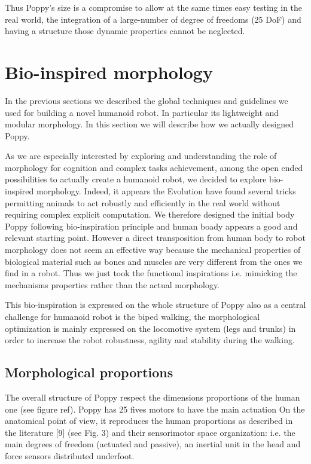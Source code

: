 Thus Poppy's size is a compromise to allow at the same times easy testing in the real world, the integration of a large-number of degree of freedoms (25 DoF) and having a structure those dynamic properties cannot be neglected.



\section{Bio-inspired morphology} %

In the previous sections we described the global techniques and guidelines we used for building a novel humanoid robot. In particular its lightweight and modular morphology. In this section we will describe how we actually designed Poppy.

As we are especially interested by exploring and understanding the role of morphology for cognition and complex tasks achievement, among the open ended possibilities to actually create a humanoid robot, we decided to explore bio-inspired morphology. Indeed, it appears the Evolution have found several tricks permitting animals to act robustly and efficiently in the real world without requiring complex explicit computation.
We therefore designed the initial body Poppy following bio-inspiration principle and human boady appears a good  and relevant starting point. However a direct transposition from human body to robot morphology does not seem an effective way because the mechanical properties of biological material such as bones and muscles are very different from the ones we find in a robot. Thus we just took the functional inspirations i.e. mimicking the mechanisms properties rather than the actual morphology.

This bio-inspiration is expressed on the whole structure of Poppy also as a central challenge for humanoid robot is the biped walking, the morphological optimization is mainly expressed on the locomotive system (legs and trunks) in order to increase the robot robustness, agility and stability during the walking.


\subsection{Morphological proportions} %

The overall structure of Poppy respect the dimensions proportions of the human one (see figure ref). Poppy has 25 fives motors to have the main actuation
On the anatomical point of view, it reproduces the human proportions as described in the literature [9] (see Fig. 3) and their sensorimotor space organization: i.e. the main degrees of freedom (actuated and passive), an inertial unit in the head and force sensors distributed underfoot.

